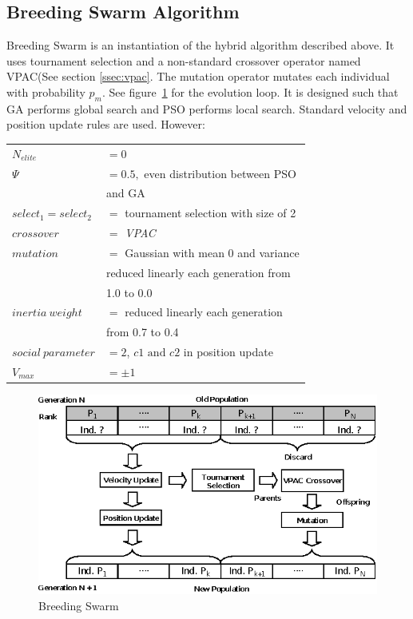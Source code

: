 \documentclass{acm_proc_article-sp}
\begin{document}
\subsection{Breeding Swarm Algorithm}
Breeding Swarm is an instantiation of the hybrid algorithm described above. It uses tournament selection and a non-standard crossover operator named VPAC(See section \ref{ssec:vpac}. The mutation operator mutates each individual with probability $p_m$. See figure~\ref{fig:bs} for the evolution loop. It is designed such that GA performs global search and PSO performs local search.
Standard velocity and position update rules are used. However: \\
  \begin{tabular}{ll}
  $N_{elite}$ & $ = 0$\\
  $\Psi$ & $ = 0.5, $ even distribution between PSO \\
  & and GA \\
  $select_1 = select_2 $ & $ = $ tournament selection with size of 2\\
  $crossover$ & $ = $ \emph{VPAC} \\
  $mutation$ & $ = $ Gaussian with mean 0 and variance \\
  & reduced linearly each generation from \\
  & 1.0 to 0.0 \\
  $inertia \: weight$  & $ = $ reduced linearly each generation \\
  & from 0.7 to 0.4 \\
  $social \: parameter$ & $ = 2$, $c1 \mbox{ and } c2$ in position update\\
  $V_{max} $ & $ = \pm 1$ \\
  \end{tabular}

\begin{figure}[h]
\centering
\includegraphics[scale=1.0]{figbs.eps}
\caption{Breeding Swarm~\cite{SET052}}\label{fig:bs}
\end{figure}
\end{document}
